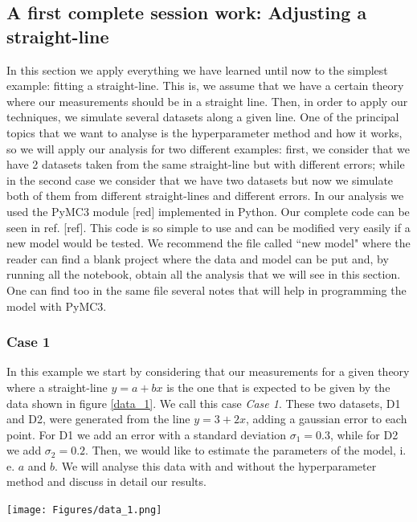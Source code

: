 \documentclass[onecolumn,           %
               showpacs,            %
               preprintnumbers,     %
               aps,                 %
               letterpaper,             %
               superscriptaddress,      %
               nofootinbib,         %
               tightenlines,        %
               floats,floatfix      %
               ,usenatbib,
               ]{revtex4-1}
\begin{document}
 \subsection{A first complete session work: Adjusting a straight-line}

In this section we apply everything we have learned until now to the simplest example: fitting a straight-line. This is, we assume that we have a certain theory where our measurements should be in a straight line. Then, in order to apply our techniques, we simulate several datasets along a given line. One of the principal topics that we want to analyse is the hyperparameter method and how it works, so we will apply our analysis for two different examples: first, we consider that we have 2 datasets taken from the same straight-line but with different errors; while in the second case we consider that we have two datasets but now we simulate both of them from different straight-lines and different errors. In our analysis we used the PyMC3 module [red] implemented in Python. Our complete code can be seen in ref. [ref]. This code is so simple to use and can be modified very easily if a new model would be tested. We recommend the file called ``new model" where the reader can find a blank project where the data and model can be put and, by running all the notebook, obtain all the analysis that we will see in this section. One can find too in the same file several notes that will help in programming the model with PyMC3. 

\subsubsection{Case 1}

In this example we start by considering that our measurements for a given theory where a straight-line $y=a+bx$ is the one that is expected to be given by the data shown in figure \ref{data_1}. We call this case \textit{Case 1}. These two datasets, D1 and D2, were generated from the line $y=3+2x$, adding a gaussian error to each point. For D1 we add an error with a standard deviation $\sigma_1 = 0.3$, while for D2 we add $\sigma_2 = 0.2$. Then, we would like to estimate the parameters of the model, i. e. $a$ and $b$. We will analyse this data with and without the hyperparameter method and discuss in detail our results.

\begin{minipage}{\textwidth}
\centering
\texttt{[image: Figures/data\_1.png]}
\label{data_1}
\end{minipage}
\end{document}
